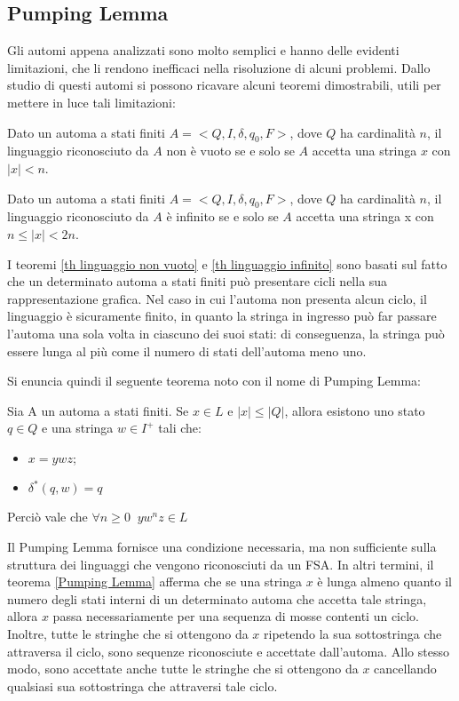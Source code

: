   \subsection{Pumping Lemma}
  Gli automi appena analizzati sono molto semplici e hanno delle evidenti limitazioni, che li rendono inefficaci nella risoluzione di alcuni problemi. 
  Dallo studio di questi automi si possono ricavare alcuni teoremi dimostrabili, utili per mettere in luce tali limitazioni:

  \begin{theorem} \label{th linguaggio non vuoto}
    Dato un automa a stati finiti \(A=<Q, I, \delta, q_0, F>\), dove \(Q\) ha cardinalità \(n\), il linguaggio riconosciuto da \(A\) non è vuoto se e solo se \(A\) accetta una stringa \(x\) con \(|x|<n\).
  \end{theorem}

  \begin{theorem} \label{th linguaggio infinito}
    Dato un automa a stati finiti \(A=<Q, I, \delta, q_0, F>\), dove \(Q\) ha cardinalità \(n\), il linguaggio riconosciuto da \(A\) è infinito se e solo se \(A\) accetta una stringa x con \(n\le |x| < 2n\).
  \end{theorem}

  I teoremi \ref{th linguaggio non vuoto} e \ref{th linguaggio infinito} sono basati sul fatto che un determinato automa a stati finiti può presentare cicli nella sua rappresentazione grafica. Nel caso in cui l'automa non presenta alcun ciclo, il linguaggio è sicuramente finito, in quanto la stringa in ingresso può far passare l'automa una sola volta in ciascuno dei suoi stati: di conseguenza, la stringa può essere lunga al più come il numero di stati dell'automa meno uno. 

  Si enuncia quindi il seguente teorema noto con il nome di Pumping Lemma:

  \begin{theorem} \label{Pumping Lemma}
    Sia A un automa a stati finiti. Se \(x \in L\)  e \(|x|\leq|Q|\), allora esistono uno stato \(q \in Q\) e una stringa \(w \in I^+\) tali che:
    \begin{itemize}
      \item \(x = ywz\);
      \item \(\delta^*(q,w)=q\)
    \end{itemize}
    Perciò vale che \(\forall n\geq 0 \;\; yw^nz\in L\)
  \end{theorem}

  Il Pumping Lemma fornisce una condizione necessaria, ma non sufficiente sulla struttura dei linguaggi che vengono riconosciuti da un FSA. In altri termini, il teorema \ref{Pumping Lemma} afferma che se una stringa \(x\) è lunga almeno quanto il numero degli stati interni di un determinato automa che accetta tale stringa, allora \(x\) passa necessariamente per una sequenza di mosse contenti un ciclo. Inoltre, tutte le stringhe che si ottengono da \(x\) ripetendo la sua sottostringa che attraversa il ciclo, sono sequenze riconosciute e accettate dall’automa. Allo stesso modo, sono accettate anche tutte le stringhe che si ottengono da \(x\) cancellando qualsiasi sua sottostringa che attraversi tale ciclo.

